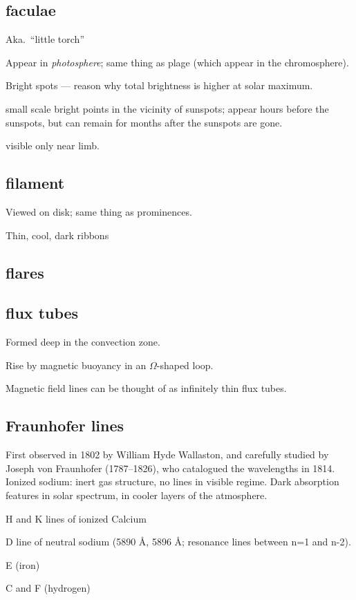 \documentclass[12pt]{article}
\begin{document}
\subsection*{faculae}
Aka.\ ``little torch''
    \begin{itemize*}
        \item Appear in \emph{photosphere}; same thing as plage
            (which appear in the chromosphere).
        \item Bright spots --- reason why total brightness is higher at
            solar maximum.
        \item small scale bright points in the vicinity of sunspots;
            appear hours before the sunspots, but can remain for months
            after the sunspots are gone.
        \item visible only near limb.
    \end{itemize*}

\subsection*{filament}
    \begin{itemize*}
        \item Viewed on disk; same thing as prominences.
        \item Thin, cool, dark ribbons
    \end{itemize*}

\subsection*{flares}

\subsection*{flux tubes}
    \begin{itemize*}
        \item Formed deep in the convection zone.
        \item Rise by magnetic buoyancy in an $\Omega$-shaped loop.
        \item Magnetic field lines can be thought of as infinitely
          thin flux tubes.
    \end{itemize*}

\subsection*{Fraunhofer lines}
First observed in 1802 by William Hyde Wallaston, and carefully
studied by Joseph von Fraunhofer (1787--1826), who catalogued
the wavelengths in 1814. Ionized sodium: inert gas structure,
no lines in visible regime. Dark absorption features in solar
spectrum, in cooler layers of the atmosphere.
\begin{itemize*}
    \item H and K lines of ionized Calcium
    \item D line of neutral sodium (5890 \AA{}, 5896 \AA{};
        resonance lines between n=1 and n-2).
    \item E (iron)
    \item C and F (hydrogen)
\end{itemize*}
\end{document}
